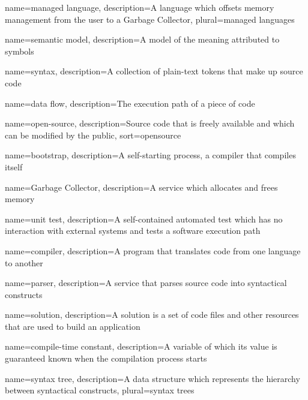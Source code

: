 
{
	name={managed language},
	description={A language which offsets memory management from the user to a Garbage Collector},
	plural={managed languages}
}


{
	name={semantic model},
	description={A model of the meaning attributed to symbols}
}

{
	name={syntax},
	description={A collection of plain-text tokens that make up source code}
}

{
	name={data flow},
	description={The execution path of a piece of code}
}

{
	name={open-source},
	description={Source code that is freely available and which can be modified by the public},
	sort={opensource}
}

{
	name={bootstrap},
	description={A self-starting process, a compiler that compiles itself}
}

{
	name={Garbage Collector},
	description={A service which allocates and frees memory}
}

{
	name={unit test},
	description={A self-contained automated test which has no interaction with external systems and tests a software execution path}
}

{
	name={compiler},
	description={A program that translates code from one language to another}
}


{
	name={parser},
	description={A service that parses source code into syntactical constructs}
}


{
	name={solution},
	description={A solution is a set of code files and other resources that are used to build an application}
}

{
	name={compile-time constant},
	description={A variable of which its value is guaranteed known when the compilation process starts}
}

{
	name={syntax tree},
	description={A data structure which represents the hierarchy between syntactical constructs},
	plural={syntax trees}
}

